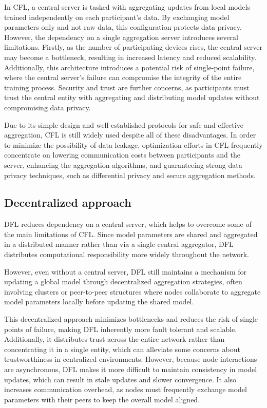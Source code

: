 In \gls{CFL}, a central server is tasked with aggregating updates from local models trained independently on each participant’s data. By exchanging model parameters only and not raw data, this configuration protects data privacy. However, the dependency on a single aggregation server introduces several limitations. Firstly, as the number of participating devices rises, the central server may become a bottleneck, resulting in increased latency and reduced scalability. Additionally, this architecture introduces a potential risk of single-point failure, where the central server’s failure can compromise the integrity of the entire training process. Security and trust are further concerns, as participants must trust the central entity with aggregating and distributing model updates without compromising data privacy.

Due to its simple design and well-established protocols for safe and effective aggregation, \gls{CFL} is still widely used despite all of these disadvantages. In order to minimize the possibility of data leakage, optimization efforts in \gls{CFL} frequently concentrate on lowering communication costs between participants and the server, enhancing the aggregation algorithms, and guaranteeing strong data privacy techniques, such as differential privacy and secure aggregation methods.

\subsection{Decentralized approach}
\label{sub:decentralized_approach}

\gls{DFL} reduces dependency on a central server, which helps to overcome some of the main limitations of CFL. Since model parameters are shared and aggregated in a distributed manner rather than via a single central aggregator, DFL distributes computational responsibility more widely throughout the network. 

However, even without a central server, \gls{DFL} still maintains a mechanism for updating a global model through decentralized aggregation strategies, often involving clusters or peer-to-peer structures where nodes collaborate to aggregate model parameters locally before updating the shared model.

This decentralized approach minimizes bottlenecks and reduces the risk of single points of failure, making DFL inherently more fault tolerant and scalable. Additionally, it distributes trust across the entire network rather than concentrating it in a single entity, which can alleviate some concerns about trustworthiness in centralized environments. However, because node interactions are asynchronous, DFL makes it more difficult to maintain consistency in model updates, which can result in stale updates and slower convergence. It also increases communication overhead, as nodes must frequently exchange model parameters with their peers to keep the overall model aligned.

